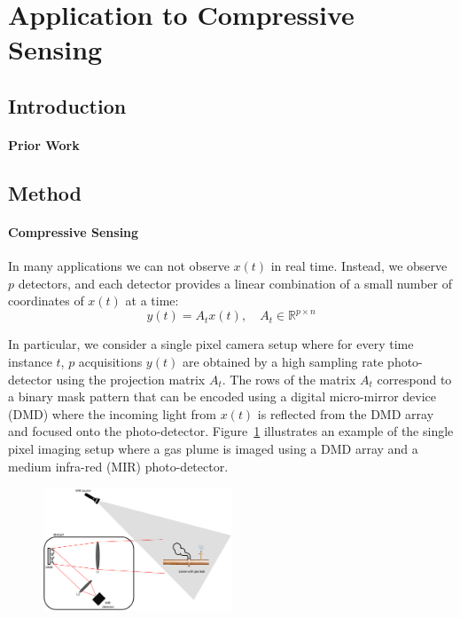 \section{Application to Compressive Sensing}
\subsection{Introduction}
\paragraph{Prior Work}
\subsection{Method}
\paragraph{Compressive Sensing} In many applications we can not observe $x(t)$ in real time. Instead, we observe $p$ detectors, and each detector provides a linear combination of a small number of coordinates of $x(t)$ at a time:
\begin{equation}
    \label{eq:cs_definition}
    y(t) = A_t x(t), \quad A_t \in \mathbb{R}^{p\times n}
\end{equation}

In particular, we consider a single pixel camera setup where for every time instance $t$, $p$ acquisitions $y(t)$ are obtained by a high sampling rate photo-detector using the projection matrix $A_t$. The rows of the matrix $A_t$ correspond to a binary mask pattern that can be encoded using a digital micro-mirror device (DMD) where the incoming light from $x(t)$ is reflected from the DMD array and focused onto the photo-detector. Figure~\ref{fig:SPI} illustrates an example of the single pixel imaging setup where a gas plume is imaged using a DMD array and a medium infra-red (MIR) photo-detector. 
\begin{figure}
\centering
\includegraphics[width = 0.5\textwidth]{figures/SPI_setup.pdf}\label{fig:SPI}
\end{figure}


